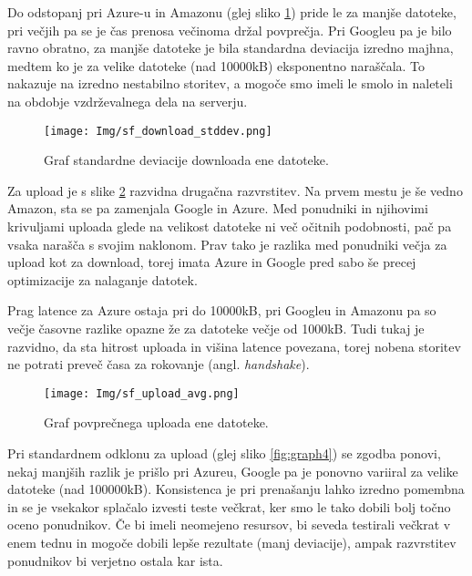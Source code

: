 \documentclass[11pt]{article}
\begin{document}
Do odstopanj pri Azure-u in Amazonu (glej sliko \ref{fig:graph2}) pride le za manjše datoteke, pri večjih pa se je čas prenosa večinoma držal povprečja. Pri Googleu pa je bilo ravno obratno, za manjše datoteke je bila standardna deviacija izredno majhna, medtem ko je za velike datoteke (nad 10000kB) eksponentno naraščala. To nakazuje na izredno nestabilno storitev, a mogoče smo imeli le smolo in naleteli na obdobje vzdrževalnega dela na serverju. 

\begin{figure}[H]
    \begin{center}
        \texttt{[image: Img/sf\_download\_stddev.png]}
        \caption{Graf standardne deviacije downloada ene datoteke.}
        \label{fig:graph2}
    \end{center}
\end{figure}

Za upload je s slike \ref{fig:graph3} razvidna drugačna razvrstitev. Na prvem mestu je še vedno Amazon, sta se pa zamenjala Google in Azure. Med ponudniki in njihovimi krivuljami uploada glede na velikost datoteke ni več očitnih podobnosti, pač pa vsaka narašča s svojim naklonom. Prav tako je razlika med ponudniki večja za upload kot za download, torej imata Azure in Google pred sabo še precej optimizacije za nalaganje datotek.

Prag latence za Azure ostaja pri do 10000kB, pri Googleu in Amazonu pa so večje časovne razlike opazne že za datoteke večje od 1000kB. Tudi tukaj je razvidno, da sta hitrost uploada in višina latence povezana, torej nobena storitev ne potrati preveč časa za rokovanje (angl. \textit{handshake}).

\begin{figure}[H]
    \begin{center}
        \texttt{[image: Img/sf\_upload\_avg.png]}
        \caption{Graf povprečnega uploada ene datoteke.}
        \label{fig:graph3}
    \end{center}
\end{figure}

Pri standardnem odklonu za upload (glej sliko \ref{fig:graph4}) se zgodba ponovi, nekaj manjših razlik je prišlo pri Azureu, Google pa je ponovno variiral za velike datoteke (nad 100000kB). Konsistenca je pri prenašanju lahko izredno pomembna in se je vsekakor splačalo izvesti teste večkrat, ker smo le tako dobili bolj točno oceno ponudnikov. Če bi imeli neomejeno resursov, bi seveda testirali večkrat v enem tednu in mogoče dobili lepše rezultate (manj deviacije), ampak razvrstitev ponudnikov bi verjetno ostala kar ista.
\end{document}
